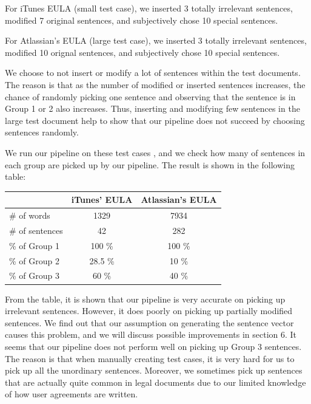 \documentclass[conference,compsoc]{IEEEtran}
\begin{document}
  For iTunes EULA (small test case), we inserted 3 totally irrelevant sentences, modified 7 original sentences, and subjectively chose 10 special sentences. 

  For Atlassian's EULA (large test case), we inserted 3 totally irrelevant sentences, modified 10 orignal sentences, and subjectively chose 10 special sentences. 

  We choose to not insert or modify a lot of sentences within the test documents. The reason is that as the number of modified or inserted sentences increases, the chance of randomly picking one sentence and observing that the sentence is in Group 1 or 2 also increases. Thus, inserting and modifying few sentences in the large test document help to show that our pipeline does not succeed by choosing sentences randomly. 

  We run our pipeline on these test cases , and we check how many of sentences in each group are picked up by our pipeline. The result is shown in the following table: 

\begin{center}
  \begin{tabular}{ | l || c || c ||}
    \hline
                & iTunes' EULA & Atlassian's EULA \\ \hline
     \# of words       & 1329    & 7934 \\ \hline
     \# of sentences   & 42      & 282  \\ \hline
     \% of Group 1 & 100  \% & 100 \% \\ \hline
     \% of Group 2 & 28.5 \% & 10 \% \\ \hline %
     \% of Group 3 & 60 \% & 40 \% \\ \hline %
  \end{tabular}
\end{center}

  From the table, it is shown that our pipeline is very accurate on picking up irrelevant sentences. However, it does poorly on picking up partially modified sentences. We find out that our assumption on generating the sentence vector causes this problem, and we will discuss possible improvements in section 6. It seems that our pipeline does not perform well on picking up Group 3 sentences. The reason is that when manually creating test cases, it is very hard for us to pick up all the unordinary sentences. Moreover, we sometimes pick up sentences that are actually quite common in legal documents due to our limited knowledge of how user agreements are written.
\end{document}
